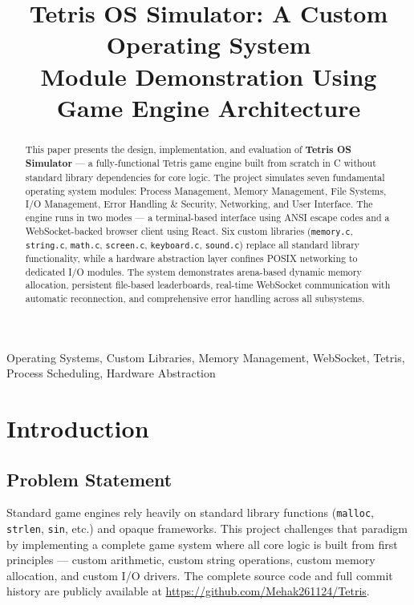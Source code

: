 \documentclass[conference]{IEEEtran}
\title{Tetris OS Simulator: A Custom Operating System\\Module Demonstration Using Game Engine Architecture}
\author{
  \IEEEauthorblockN{Mehak Jain, Anuj Kumar Singh}
  \IEEEauthorblockA{Operating System}
}
\begin{document}
\maketitle

\begin{abstract}
This paper presents the design, implementation, and evaluation of \textbf{Tetris OS Simulator} --- a fully-functional Tetris game engine built from scratch in C without standard library dependencies for core logic. The project simulates seven fundamental operating system modules: Process Management, Memory Management, File Systems, I/O Management, Error Handling \& Security, Networking, and User Interface. The engine runs in two modes --- a terminal-based interface using ANSI escape codes and a WebSocket-backed browser client using React. Six custom libraries (\texttt{memory.c}, \texttt{string.c}, \texttt{math.c}, \texttt{screen.c}, \texttt{keyboard.c}, \texttt{sound.c}) replace all standard library functionality, while a hardware abstraction layer confines POSIX networking to dedicated I/O modules. The system demonstrates arena-based dynamic memory allocation, persistent file-based leaderboards, real-time WebSocket communication with automatic reconnection, and comprehensive error handling across all subsystems.
\end{abstract}

\begin{IEEEkeywords}
Operating Systems, Custom Libraries, Memory Management, WebSocket, Tetris, Process Scheduling, Hardware Abstraction
\end{IEEEkeywords}

\section{Introduction}

\subsection{Problem Statement}
Standard game engines rely heavily on standard library functions (\texttt{malloc}, \texttt{strlen}, \texttt{sin}, etc.) and opaque frameworks. This project challenges that paradigm by implementing a complete game system where all core logic is built from first principles --- custom arithmetic, custom string operations, custom memory allocation, and custom I/O drivers. The complete source code and full commit history are publicly available at \url{https://github.com/Mehak261124/Tetris}.
\end{document}
